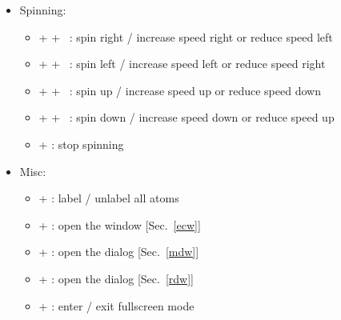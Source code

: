{\begin{itemize}
\begin{itemize}
\begin{itemize}
\item[] \Shift + \UArrow\ : zoom out
\item[] \Shift + \DArrow\ : zoom in 
\end{itemize}
\item Spinning: 
\begin{itemize}
\item[] \Ctrl + \Shift + \RArrow\ : spin right / increase speed right or reduce speed left
\item[] \Ctrl + \Shift + \RArrow\ : spin left / increase speed left or reduce speed right
\item[] \Ctrl + \Shift + \UArrow\ : spin up / increase speed up or reduce speed down
\item[] \Ctrl + \Shift + \DArrow\ : spin down / increase speed down or reduce speed up
\item[] \Ctrl +  : stop spinning 
\end{itemize}
\item Misc:
\begin{itemize}
\item[] \Ctrl +  : label / unlabel all atoms 
\item[] \Ctrl +  : open the  window [Sec.~\ref{ecw}]
\item[] \Ctrl +  : open the  dialog [Sec.~\ref{mdw}]
\item[] \Ctrl +  : open the  dialog [Sec.~\ref{rdw}]
\item[] \Ctrl +  : enter / exit fullscreen mode 
\end{itemize}
\end{itemize}
\end{itemize}}

